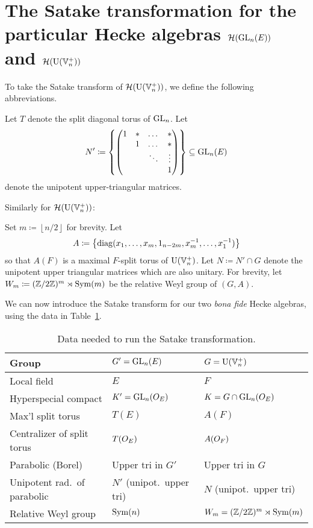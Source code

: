 \section{The Satake transformation for the particular Hecke algebras $\mathcal H(\operatorname{GL}_n(E))$ and $\mathcal H(\operatorname{U}(\mathbb V_n^+))$}
To take the Satake transform of $\mathcal H(\operatorname{U}(\mathbb V_n^+))$, we define the following abbreviations.
\begin{itemize}
  \ii Let $T$ denote the split diagonal torus of $\operatorname{GL}_n$.
  \ii Let
  \[ N' \coloneqq \left\{ \begin{pmatrix}
      1 & \ast & \dots & \ast \\
        & 1 & \dots & \ast \\
        &   & \ddots & \vdots \\
        &   &   & 1 \end{pmatrix}\right\} \subseteq \operatorname{GL}_n(E) \]
  denote the unipotent upper-triangular matrices.
\end{itemize}
Similarly for $\mathcal H(\operatorname{U}(\mathbb V_n^+))$:
\begin{itemize}
  \ii Set $m \coloneqq \left\lfloor n/2 \right\rfloor$ for brevity.
  \ii Let
  \[ A \coloneqq \left\{
    \operatorname{diag}(x_1, \dots, x_m, 1_{n-2m}, x_m^{-1}, \dots, x_1^{-1}) \right\} \]
  so that $A(F)$ is a maximal $F$-split torus of $\operatorname{U}(\mathbb V_n^+)$.
  \ii Let $N \coloneqq N' \cap G$ denote the unipotent upper triangular matrices
  which are also unitary.
  \ii For brevity, let $W_m \coloneqq (\mathbb Z/2\mathbb Z)^m \rtimes \operatorname{Sym}(m)$
  be the relative Weyl group of $(G,A)$.
\end{itemize}

We can now introduce the Satake transform for our two
\emph{bona fide} Hecke algebras, using the data in Table~\ref{tab:satakestuff}.

\begin{table}[ht]
  \centering
  \begin{tabular}{lll}
    \toprule
    Group & $G' = \operatorname{GL}_n(E)$ & $G = \operatorname{U}(\mathbb V_n^+)$ \\ \midrule
    Local field & $E$ & $F$ \\\hline
    Hyperspecial compact & $K' = \operatorname{GL}_n(O_E)$ & $K = G \cap \operatorname{GL}_n(O_E)$ \\\hline
    Max'l split torus & $T(E)$ & $A(F)$ \\\hline
    Centralizer of split torus & $T(O_E)$ & $A(O_F)$ \\\hline
    Parabolic (Borel) & Upper tri in $G'$ & Upper tri in $G$ \\\hline
    Unipotent rad.\ of parabolic & $N'$ (unipot.\ upper tri) & $N$ (unipot.\ upper tri) \\\hline
    Relative Weyl group & $\operatorname{Sym}(n)$ & $W_m = (\mathbb Z/2\mathbb Z)^m \rtimes \operatorname{Sym}(m)$ \\
    \bottomrule
  \end{tabular}
  \caption{Data needed to run the Satake transformation.}
  \label{tab:satakestuff}
\end{table}

